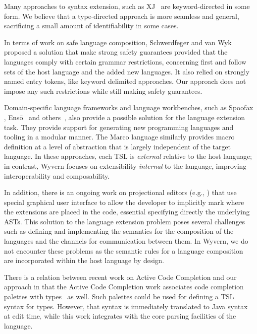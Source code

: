 Many approaches to syntax extension, such as XJ~\cite{DBLP:conf/scam/ClarkSW08} are keyword-directed in some form. We believe that a type-directed approach is more seamless and general, sacrificing a small amount of identifiability in some cases. 

In terms of work on safe language composition, Schwerdfeger and van Wyk~\cite{Schwerdfeger:2009:VCD:1542476.1542499} proposed a solution that make strong safety guarantees provided that the languages comply with certain grammar restrictions, concerning first and follow sets of the host language and the added new languages. It also relied on strongly named entry tokens, like keyword delimited approaches. Our approach does not impose any such restrictions while still making safety guarantees.

Domain-specific language frameworks and language workbenches, such as Spoofax \cite{KatsVisser2010}, Ens\={o}~\cite{enso} and others~\cite{krahn2008monticore,van1992pregmatic}, also provide a possible solution for the language extension task. They provide support for generating new programming languages and tooling in a modular manner.  The Marco language \cite{lee:2012:marco} similarly provides macro definition at a level of abstraction that is largely independent of the target language. In these approaches, each TSL is \emph{external} relative to the host language; in contrast, Wyvern focuses on extensibility \emph{internal} to the language, improving interoperability and composability.

In addition, there is an ongoing work on projectional editors (e.g., \cite{mps,Diekmann:2013}) that use special graphical user interface to allow the developer to implicitly mark where the extensions are placed in the code, essential specifying directly the underlying ASTs. This solution to the language extension problem poses several challenges such as defining and implementing the semantics for the composition of the languages and the channels for communication between them. In Wyvern, we do not encounter these problems as the semantic rules for a language composition are incorporated within the host language by design.


There is a relation between recent work on Active Code Completion and our approach in that
the Active Code Completion work associates code completion palettes with types~\cite{omar2012active} as well. Such palettes could be used for defining a TSL syntax for types. However, that syntax
is immediately translated to Java syntax at edit time, while this work
integrates with the core parsing facilities of the language.



